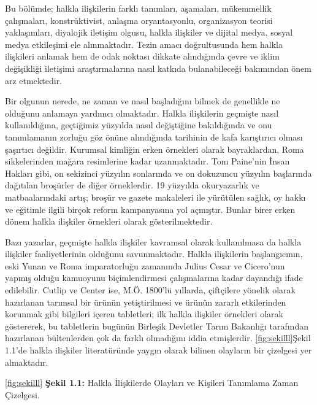 \documentclass[
]{book}
\begin{document}
Bu bölümde; halkla ilişkilerin farklı tanımları, aşamaları, mükemmellik çalışmaları, konstrüktivist, anlaşma oryantasyonlu, organizasyon teorisi yaklaşımları, diyalojik iletişim olgusu, halkla ilişkiler ve dijital medya, sosyal medya etkileşimi ele alınmaktadır. Tezin amacı doğrultusunda hem halkla ilişkileri anlamak hem de odak noktası dikkate alındığında çevre ve iklim değişikliği iletişimi araştırmalarına nasıl katkıda bulanabileceği bakımından önem arz etmektedir.

Bir olgunun nerede, ne zaman ve nasıl başladığını bilmek de genellikle ne olduğunu anlamaya yardımcı olmaktadır. Halkla ilişkilerin geçmişte nasıl kullanıldığına, geçtiğimiz yüzyılda nasıl değiştiğine bakıldığında ve onu tanımlamanın zorluğu göz önüne alındığında tarihinin de kafa karıştırıcı olması şaşırtıcı değildir. Kurumsal kimliğin erken örnekleri olarak bayraklardan, Roma sikkelerinden mağara resimlerine kadar uzanmaktadır. Tom Paine'nin İnsan Hakları gibi, on sekizinci yüzyılın sonlarında ve on dokuzuncu yüzyılın başlarında dağıtılan broşürler de diğer örneklerdir. 19 yüzyılda okuryazarlık ve matbaalarındaki artış; broşür ve gazete makaleleri ile yürütülen sağlık, oy hakkı ve eğitimle ilgili birçok reform kampanyasına yol açmıştır. Bunlar birer erken dönem halkla ilişkiler örnekleri olarak gösterilmektedir. \citep{theaker2016public}

Bazı yazarlar, geçmişte halkla ilişkiler kavramsal olarak kullanılmasa da halkla ilişkiler faaliyetlerinin olduğunu savunmaktadır. Halkla ilişkilerin başlangıcının, eski Yunan ve Roma imparatorluğu zamanında Julius Cesar ve Cicero'nun yapmış olduğu kamuoyunu biçimlendirmesi çalışmalarına kadar dayandığı ifade edilebilir. Cutlip ve Center ise, M.Ö. 1800'lü yıllarda, çiftçilere yönelik olarak hazırlanan tarımsal bir ürünün yetiştirilmesi ve ürünün zararlı etkilerinden korunmak gibi bilgileri içeren tabletleri; ilk halkla ilişkiler örnekleri olarak göstererek, bu tabletlerin bugünün Birleşik Devletler Tarım Bakanlığı tarafından hazırlanan bültenlerden çok da farklı olmadığını iddia etmişlerdir.\citep{peltekoglu2016halkla} \ref{fig:sekilll}Şekil 1.1'de halkla ilişkiler literatüründe yaygın olarak bilinen olayların bir çizelgesi yer almaktadır.

\ref{fig:sekilll}
\textbf{Şekil 1.1:} Halkla İlişkilerde Olayları ve Kişileri Tanımlama Zaman Çizelgesi.
\end{document}
